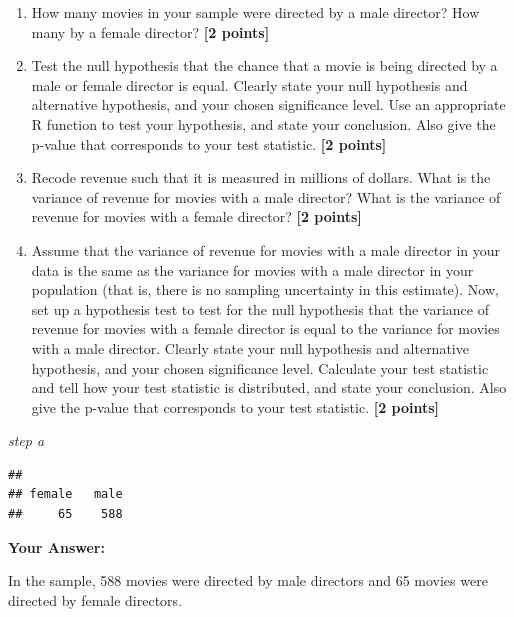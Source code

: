 \documentclass[
]{article}
\newenvironment{Shaded}{\begin{snugshade}}{\end{snugshade}}
\newcommand{\FunctionTok}[1]{\textcolor[rgb]{0.13,0.29,0.53}{\textbf{#1}}}
\newcommand{\NormalTok}[1]{#1}
\newcommand{\SpecialCharTok}[1]{\textcolor[rgb]{0.81,0.36,0.00}{\textbf{#1}}}
\providecommand{\tightlist}{%
  \setlength{\itemsep}{0pt}\setlength{\parskip}{0pt}}
\begin{document}
\begin{enumerate}
\def\labelenumi{\alph{enumi}.}
\tightlist
\item
  How many movies in your sample were directed by a male director? How
  many by a female director? \textbf{[2 points]}
\item
  Test the null hypothesis that the chance that a movie is being
  directed by a male or female director is equal. Clearly state your
  null hypothesis and alternative hypothesis, and your chosen
  significance level. Use an appropriate R function to test your
  hypothesis, and state your conclusion. Also give the p-value that
  corresponds to your test statistic. \textbf{[2 points]}
\item
  Recode revenue such that it is measured in millions of dollars. What
  is the variance of revenue for movies with a male director? What is
  the variance of revenue for movies with a female director?
  \textbf{[2 points]}
\item
  Assume that the variance of revenue for movies with a male director in
  your data is the same as the variance for movies with a male director
  in your population (that is, there is no sampling uncertainty in this
  estimate). Now, set up a hypothesis test to test for the null
  hypothesis that the variance of revenue for movies with a female
  director is equal to the variance for movies with a male director.
  Clearly state your null hypothesis and alternative hypothesis, and
  your chosen significance level. Calculate your test statistic and tell
  how your test statistic is distributed, and state your conclusion.
  Also give the p-value that corresponds to your test statistic.
  \textbf{[2 points]}
\end{enumerate}

\emph{step a}

\begin{Shaded}
\end{Shaded}

\begin{verbatim}
## 
## female   male 
##     65    588
\end{verbatim}

\textbf{Your Answer:}

In the sample, 588 movies were directed by male directors and 65 movies
were directed by female directors.
\end{document}
